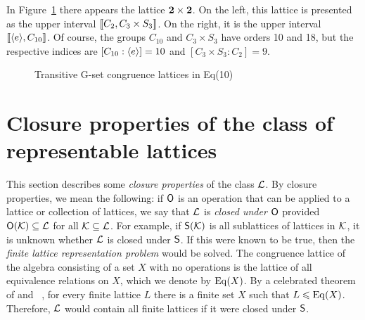 In Figure~\ref{fig:10} there appears the lattice $\mathbf{2}\times \mathbf{2}$.
On the left, this lattice is presented as the upper interval
$\llbracket C_2, C_3 \times S_3\rrbracket$. On the right, it is the upper interval 
$\llbracket \langle e\rangle, C_{10}\rrbracket$. Of course, the groups $C_{10}$ and
$C_3 \times S_3$ have orders 10 and 18, but the respective indices are
$[C_{10}:\langle e\rangle] = 10$ and $[C_3 \times S_3:C_2]=9$. 
\begin{figure}
\caption{Transitive G-set congruence lattices in Eq(10)}
\label{fig:10}
\begin{center}
\end{center}
\end{figure}


\section{Closure properties of the class of representable lattices}
\label{sec:clos-prop-class}
This section describes some
\emph{closure properties}
of the class $\mathcal{L}$. %
By closure properties, we mean the following: if $\mathsf{O}$ is an operation that can
be applied to a lattice or collection of lattices, we say that $\mathcal{L}$ is
\emph{closed under $\mathsf{O}$} provided $\mathsf{O}(\mathcal{K}) \subseteq \mathcal{L}$ for all 
$\mathcal{K}\subseteq \mathcal{L}$. For example, if 
$\mathsf{S}(\mathcal{K})$ is all sublattices of lattices in $\mathcal{K}$, 
it is unknown whether $\mathcal{L}$ is closed under $\mathsf{S}$.  
If this were known to be true, then the 
\emph{finite lattice representation problem} would be solved.
The congruence lattice of the algebra consisting of a
set $X$ with no operations is the lattice of all equivalence relations on $X$,
which we denote by $\operatorname{Eq}(X)$.
By a celebrated theorem of \Pudlak and \Tuma~\cite{Pudlak:1980}, for every finite
lattice $L$ there is a finite set $X$ such that $L\leqslant \operatorname{Eq}(X)$.  Therefore, $\mathcal{L}$
would contain all finite lattices if it were closed under $\mathsf{S}$.


